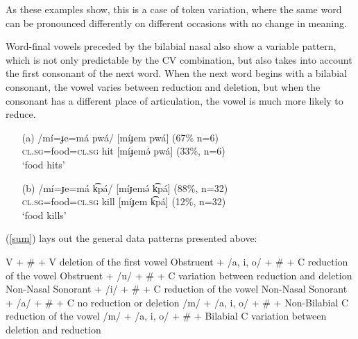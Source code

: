\documentclass[output=paper,
modfonts
]{langscibook}
\begin{document}
As these examples show, this is a case of token variation, where the same word can be pronounced differently on different occasions with no change in meaning. 

Word-final vowels preceded by the bilabial nasal also show a variable pattern, which is not only predictable by the CV combination, but also takes into account the first consonant of the next word. When the next word begins with a bilabial consonant, the vowel varies between reduction and deletion, but when the consonant has a different place of articulation, the vowel is much more likely to reduce. 

\ea \label{m}
\begin{enumerate}
\item[(a)]
\gll /mí=ɟe=má pwá/ \hspace{0.5cm} [míɟem pwá] (67\% n=6)\\
 \textsc{cl.sg}=food=\textsc{cl.sg} hit  \hspace{0.5cm} [míɟemə́ pwá] (33\%, n=6)\\ 
\glt `food hits'

\item[(b)] 
\gll /mí=ɟe=má k͡pá/ \hspace{.5cm} [míɟemə́ k͡pá] (88\%, n=32)\\
\textsc{cl.sg}=food=\textsc{cl.sg} kill \hspace{0.5cm} [míɟem k͡pá] (12\%, n=32)\\
\glt `food kills'

\end{enumerate}
\z

(\ref{sum}) lays out the general data patterns presented above:

\ea \label{sum}

V + \# + V \hfill deletion of the first vowel \newline
Obstruent + /a, i, o/ + \# + C \hfill reduction of the vowel\newline
Obstruent + /u/ + \# + C \hfill variation between reduction and deletion\newline
Non-Nasal Sonorant + /i/ + \# + C \hfill reduction of the vowel\newline
Non-Nasal Sonorant + /a/ + \# + C \hfill no reduction or deletion\newline
/m/ + /a, i, o/ + \# + Non-Bilabial C \hfill reduction of the vowel\newline
/m/ + /a, i, o/ + \# + Bilabial C \hfill variation between deletion and reduction\newline
\end{document}
